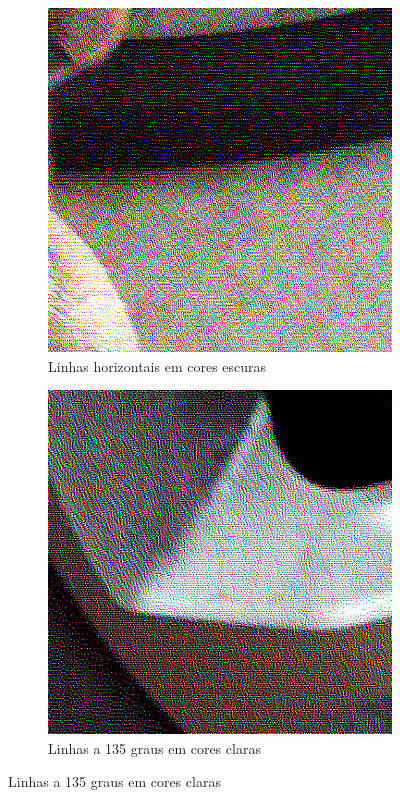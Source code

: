 \documentclass[brazilian,a4paper,twocolumn]{article}
\begin{document}
        \begin{figure}
            \centering
            \begin{subfigure}{0.24\textwidth}
                \includegraphics[width=\textwidth,keepaspectratio]{../imgs/mel_binarizada-jarvis_judice_ninke-detalhe1.png}
                \caption{Linhas horizontais em cores escuras}
            \end{subfigure}
            \begin{subfigure}{0.24\textwidth}
                \includegraphics[width=\textwidth,keepaspectratio]{../imgs/mel_binarizada-jarvis_judice_ninke-detalhe2.png}
                \caption{Linhas a 135 graus em cores claras}
            \end{subfigure}


\end{figure}
\end{document}
